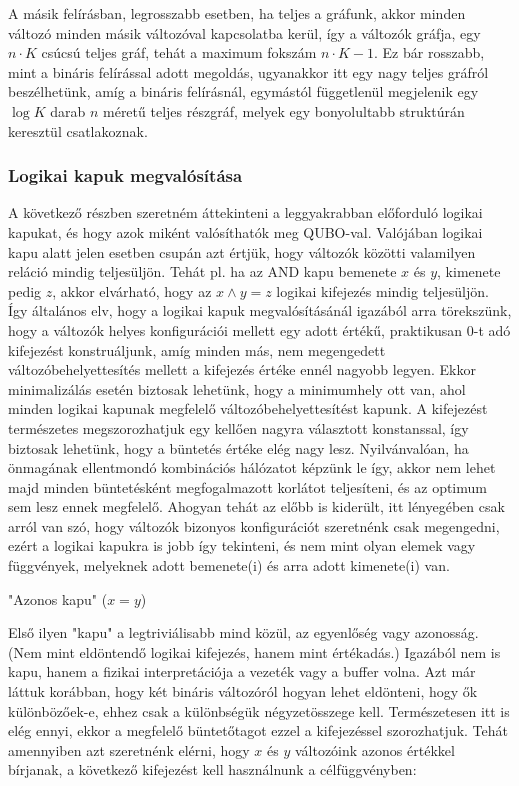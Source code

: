 A másik felírásban, legrosszabb esetben, ha teljes a gráfunk, akkor minden változó minden másik változóval kapcsolatba kerül, így a változók gráfja, egy $n \cdot K$ csúcsú teljes gráf, tehát a maximum fokszám  $n \cdot K -1$. Ez bár rosszabb, mint a bináris felírással adott megoldás, ugyanakkor itt egy nagy teljes gráfról beszélhetünk, amíg a bináris felírásnál, egymástól függetlenül megjelenik egy $\log K$ darab $n$ méretű teljes részgráf, melyek egy bonyolultabb struktúrán keresztül csatlakoznak.
  
 


\subsubsection{Logikai kapuk megvalósítása}

A következő részben szeretném áttekinteni a leggyakrabban előforduló logikai kapukat, és hogy azok miként valósíthatók meg QUBO-val. Valójában logikai kapu alatt jelen esetben csupán azt értjük, hogy változók közötti valamilyen reláció mindig teljesüljön. Tehát pl. ha az AND kapu bemenete $x$ és $y$, kimenete pedig $z$, akkor elvárható, hogy az $x \wedge y = z$ logikai kifejezés mindig teljesüljön. Így általános elv, hogy a logikai kapuk megvalósításánál igazából arra törekszünk, hogy a változók helyes konfigurációi mellett egy adott értékű, praktikusan 0-t adó kifejezést konstruáljunk, amíg minden más, nem megengedett változóbehelyettesítés mellett a kifejezés értéke ennél nagyobb legyen. Ekkor minimalizálás esetén biztosak lehetünk, hogy a minimumhely ott van, ahol minden logikai kapunak megfelelő változóbehelyettesítést kapunk. A kifejezést természetes megszorozhatjuk egy kellően nagyra választott konstanssal, így biztosak lehetünk, hogy a büntetés értéke elég nagy lesz.
Nyilvánvalóan, ha önmagának ellentmondó kombinációs hálózatot képzünk le így, akkor nem lehet majd minden büntetésként megfogalmazott korlátot teljesíteni, és az optimum sem lesz ennek megfelelő.
Ahogyan tehát az előbb is kiderült, itt lényegében csak arról van szó, hogy változók bizonyos konfigurációt szeretnénk csak megengedni, ezért a logikai kapukra is jobb így tekinteni, és nem mint olyan elemek vagy függvények, melyeknek adott bemenete(i) és arra adott kimenete(i) van.

"Azonos kapu" ($x=y$)

Első ilyen "kapu" a legtriviálisabb mind közül, az egyenlőség vagy azonosság. (Nem mint eldöntendő logikai kifejezés, hanem mint értékadás.) Igazából nem is kapu, hanem a fizikai interpretációja a vezeték vagy a buffer volna. Azt már láttuk korábban, hogy két bináris változóról hogyan lehet eldönteni, hogy ők különbözőek-e, ehhez csak a különbségük négyzetösszege kell. Természetesen itt is elég ennyi, ekkor a megfelelő büntetőtagot ezzel a kifejezéssel szorozhatjuk. Tehát amennyiben azt szeretnénk elérni, hogy $x$ és $y$ változóink azonos értékkel bírjanak, a következő kifejezést kell használnunk a célfüggvényben:


